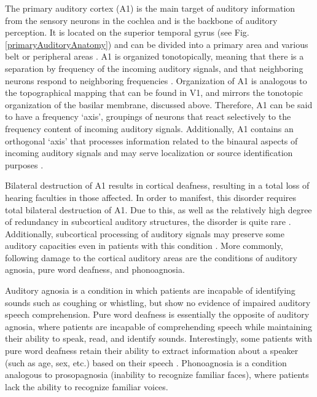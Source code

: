 \documentclass[titlepage]{article}
\begin{document}
    The primary auditory cortex (A1) is the main target of auditory information
    from the sensory neurons in the cochlea and is the backbone of auditory
    perception. It is located on the superior temporal gyrus
    (see Fig. \ref{primaryAuditoryAnatomy}) and can be divided into a primary
    area and various belt or peripheral areas \cite{Purves2001}. A1 is organized
    tonotopically, meaning that there is a separation by frequency of the
    incoming auditory signals, and that neighboring neurons respond to
    neighboring frequencies \cite{Lauter1985}. Organization of A1 is analogous
    to the topographical mapping that can be found in V1, and mirrors the
    tonotopic organization of the basilar membrane, discussed above.
    Therefore, A1 can be said to
    have a frequency `axis', groupings of neurons that react selectively to the
    frequency content of incoming auditory signals. Additionally, A1 contains an
    orthogonal `axis' that processes information related to the binaural aspects
    of incoming auditory signals and may serve localization or source
    identification purposes \cite{Purves2001}.


    Bilateral destruction of A1 results in cortical deafness, resulting in a
    total loss of hearing faculties in those affected. In order to manifest,
    this disorder requires total bilateral destruction of A1. Due to this, as
    well as the relatively high degree of redundancy in subcortical auditory
    structures, the disorder is quite rare \cite{Polster1998}. Additionally,
    subcortical processing of auditory signals may preserve some auditory
    capacities even in patients with this condition \cite{Cavinato2012}. More
    commonly, following damage to the cortical auditory areas are the conditions
    of auditory agnosia, pure word deafness, and phonoagnosia.

    Auditory agnosia
    is a condition in which patients are incapable of identifying sounds such
    as coughing or whistling, but show no evidence of impaired auditory speech
    comprehension. Pure word deafness is essentially the opposite of auditory
    agnosia, where patients are incapable of comprehending speech while
    maintaining their ability to speak, read, and identify sounds.
    Interestingly, some patients with pure word deafness retain their ability
    to extract information about a speaker (such as age, sex, etc.) based on
    their speech \cite{Polster1998}. Phonoagnosia is a condition analogous to
    prosopagnosia (inability to recognize familiar faces), where patients
    lack the ability to recognize familiar voices.
\end{document}
